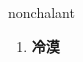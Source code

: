 
\begin{frame}
{\huge nonchalant}
\begin{center}
\begin{enumerate}\Large
  \item \textbf{冷漠}
\end{enumerate}
\end{center}
\end{frame}
